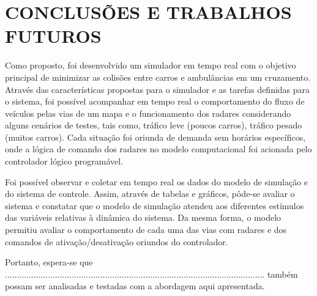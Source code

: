 \chapter{CONCLUSÕES E TRABALHOS FUTUROS}

Como proposto, foi desenvolvido um simulador em tempo real com o objetivo principal de minimizar as colisões entre carros e ambulâncias em um cruzamento. Através das características propostas para o simulador e as tarefas definidas para o sistema, foi possível acompanhar em tempo real o comportamento do fluxo de veículos pelas vias de um mapa e o funcionamento dos radares considerando alguns cenários de testes, tais como, tráfico leve (poucos carros), tráfico pesado (muitos carros). Cada situação foi oriunda de demanda sem horários específicos, onde a lógica de comando dos radares no modelo computacional foi acionada pelo controlador lógico programável. 

Foi possível observar e coletar em tempo real os dados do modelo de simulação e do sistema de controle. Assim, através de tabelas e gráficos, pôde-se avaliar o sistema e constatar que o modelo de simulação atendeu aos diferentes estímulos das variáveis relativas à dinâmica do sistema. Da mesma forma, o modelo permitiu avaliar o comportamento de cada uma das vias com radares e dos comandos de ativação/desativação oriundos do controlador. 
 
Portanto, espera-se que ............................................................................................................. 
também possam ser analisadas e testadas com a abordagem aqui 
apresentada.